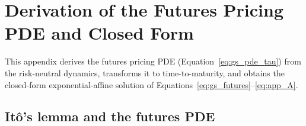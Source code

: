 \documentclass[11pt, a4paper]{article}
\begin{document}
\clearpage





\clearpage
\appendix


\section{Derivation of the Futures Pricing PDE and Closed Form}
\label{app:gs_pde}

This appendix derives the futures pricing PDE (Equation~\ref{eq:gs_pde_tau}) from the risk-neutral dynamics, transforms it to time-to-maturity, and obtains the closed-form exponential-affine solution of Equations~\ref{eq:gs_futures}--\ref{eq:app_A}.

\subsection{It\^{o}'s lemma and the futures PDE}
\end{document}

